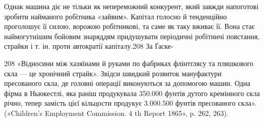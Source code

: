 Однак машина діє не тільки як непереможний конкурент,
який завжди напоготові зробити найманого робітника «зайвим».
Капітал голосно й тенденційно проголошує її силою, ворожою
робітникові, та саме як таку вживає її. Вона стає наймогутнішим
бойовим знаряддям придушувати періодичні робітничі повстання,
страйки і т. ін. проти автократії капіталу.208 За Ґаске-

208 «Відносини між хазяїнами й руками по фабриках флінтґлясу та пляшкового
скла — це хронічний страйк». Звідси швидкий розвиток мануфактури
пресованого скла, де головні операції виконуються за допомогою машин.
Одна фірма в Ньюкестлі, яка раніш продукувала 350.000 фунтів дутого
кремінного скла річно, тепер замість цієї кільцости продукує 3.000.500
фунтів пресованого скла». («Children’s Employment Commission. 4 th
Report 1865», p. 262, 263).
